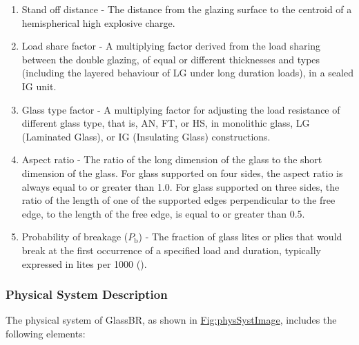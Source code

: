 \documentclass[12pt]{article}
\begin{document}
\begin{enumerate}
\begin{itemize}
\item{Non-factored load - Three second duration uniform load associated with a probability of breakage less than or equal to 8 lites per 1000 for monolithic AN glass.}
\item{Glass weight load - The dead load component of the glass weight.}
\item{Short duration load - Any load lasting 3 seconds or less.}
\item{Specified design load - The magnitude in Pa (psf), type (for example, wind or snow) and duration of the load given by the specifying authority.}
\item{Long duration load - Any load lasting approximately 30 days.}
\end{itemize}
\item{Stand off distance - The distance from the glazing surface to the centroid of a hemispherical high explosive charge.}
\item{Load share factor - A multiplying factor derived from the load sharing between the double glazing, of equal or different thicknesses and types (including the layered behaviour of LG under long duration loads), in a sealed IG unit.}
\item{Glass type factor - A multiplying factor for adjusting the load resistance of different glass type, that is, AN, FT, or HS, in monolithic glass, LG (Laminated Glass), or IG (Insulating Glass) constructions.}
\item{Aspect ratio - The ratio of the long dimension of the glass to the short dimension of the glass. For glass supported on four sides, the aspect ratio is always equal to or greater than 1.0. For glass supported on three sides, the ratio of the length of one of the supported edges perpendicular to the free edge, to the length of the free edge, is equal to or greater than 0.5.}
\item{Probability of breakage (${P_{\text{b}}}$) - The fraction of glass lites or plies that would break at the first occurrence of a specified load and duration, typically expressed in lites per 1000 (\cite{astm2016}).}
\end{enumerate}
\subsubsection{Physical System Description}
\label{Sec:PhysSyst}
The physical system of GlassBR, as shown in \hyperref[Figure:physSystImage]{Fig:physSystImage}, includes the following elements:
\end{document}
